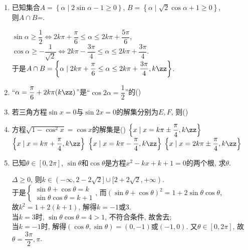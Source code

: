 \begin{enumerate}
\item 已知集合$A=\left\{\alpha\mid 2\sin\alpha-1\geq 0\right\}$, $B=\left\{\alpha\mid\sqrt2\cos\alpha+1\geq 0\right\}$, \\
则$A\cap B$=. 
\begin{jieda}
$\sin\alpha\geq\dfrac{1}{2}\iff 2k\pi+\dfrac{\pi}{6}\leq\alpha\leq 2k\pi+\dfrac{5\pi}{6}$, \\
$\cos\alpha\geq-\dfrac{1}{\sqrt{2}}\iff 2k\pi-\dfrac{3\pi}{4}\leq\alpha\leq 2k\pi+\dfrac{3\pi}{4}$. \\
于是$A\cap B=\left\{\alpha\mid 2k\pi+\dfrac{\pi}{6}\leq\alpha\leq 2k\pi+\dfrac{3\pi}{4},k\zz\right\}$. 
\end{jieda}


\item ``$\alpha=\dfrac{\pi}{6}+2k\pi(k\zz)$''是``$\cos2\alpha=\dfrac{1}{2}$''的\dotfill()


\item 若三角方程$\sin{x}=0$与$\sin2x=0$的解集分别为$E,F$, 则\dotfill()


\item 方程$\sqrt{1-\cos^2x}=\cos{x}$的解集是\dotfill()
\xx
{$\left\{x\mid x=k\pi\pm\dfrac{\pi}{4}, k\zz\right\}$}
{$\left\{x\mid x=k\pi+\dfrac{\pi}{4}, k\zz\right\}$} 
{$\left\{x\mid x=k\pi-\dfrac{\pi}{4}, k\zz\right\}$}
{$\left\{x\mid x=2k\pi\pm\dfrac{\pi}{4}, k\zz\right\}$}


\item 已知$\theta\in[0,2\pi]$, $\sin\theta$和$\cos\theta$是方程$x^2-kx+k+1=0$的两个根, 求$\theta$. 
\begin{jieda}
$\Delta\geq 0$, 则$k\in(-\infty,2-2\sqrt{2}]\cup[2+2\sqrt{2},+\infty)$. \\
于是$\begin{cases}
\sin\theta+\cos\theta=k\\
\sin\theta\cos\theta=k+1
\end{cases}$, 
而$(\sin\theta+\cos\theta)^2=1+2\sin\theta\cos\theta$, \\
故$k^2=1+2(k+1)$, 解得$k=-1$或3. \\
当$k=3$时, $\sin\theta\cos\theta=4>1$, 不符合条件, 故舍去; \\
当$k=-1$时, 解得$(\cos\theta,\sin\theta)=(0,-1)$或$(-1,0)$. 又$\theta\in[0,2\pi]$, 故$\theta=\dfrac{3\pi}{2},\pi$. 
\end{jieda}



\end{enumerate}
